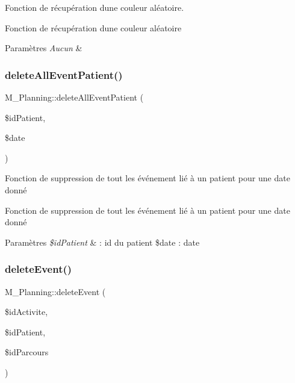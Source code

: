 Fonction de récupération d\textquotesingle{}une couleur aléatoire. 

Fonction de récupération d\textquotesingle{}une couleur aléatoire 
\begin{DoxyParams}{Paramètres}
{\em Aucun} & \\
\hline
\end{DoxyParams}
\mbox{\label{class_m___planning_af767bc59ccb16aa1c48e09a49a022bd6}} 
\subsubsection{\texorpdfstring{delete\+All\+Event\+Patient()}{deleteAllEventPatient()}}
{\footnotesize\ttfamily M\+\_\+\+Planning\+::delete\+All\+Event\+Patient (\begin{DoxyParamCaption}\item[{}]{\$id\+Patient,  }\item[{}]{\$date }\end{DoxyParamCaption})}



Fonction de suppression de tout les événement lié à un patient pour une date donné 

Fonction de suppression de tout les événement lié à un patient pour une date donné 
\begin{DoxyParams}{Paramètres}
{\em \$id\+Patient} & \+: id du patient \$date \+: date \\
\hline
\end{DoxyParams}
\mbox{\label{class_m___planning_ad34b09b84f2b551e90f10f8a59487ff7}} 
\subsubsection{\texorpdfstring{delete\+Event()}{deleteEvent()}}
{\footnotesize\ttfamily M\+\_\+\+Planning\+::delete\+Event (\begin{DoxyParamCaption}\item[{}]{\$id\+Activite,  }\item[{}]{\$id\+Patient,  }\item[{}]{\$id\+Parcours }\end{DoxyParamCaption})}



